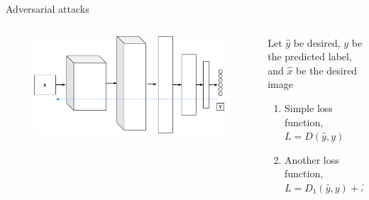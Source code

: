 \begin{frame}{Adversarial attacks}
\begin{columns}
	\begin{column}{.5\textwidth}
		\begin{figure}
			\includegraphics[width=1\textwidth]{figures/adverserial-net}
		\end{figure}
	\end{column}
	\begin{column}{.5\textwidth}
		Let $\hat{y}$ be desired,  $y$ be the predicted label, 
		and $\hat{x}$ be the desired image 
		\begin{enumerate}
			\item Simple loss function, $L=D(\hat{y},y)$
			\item Another loss function, $L=D_1(\hat{y},y) + \lambda D_2(\hat{x},x) $
		\end{enumerate}
	\end{column}
\end{columns}
\end{frame}
